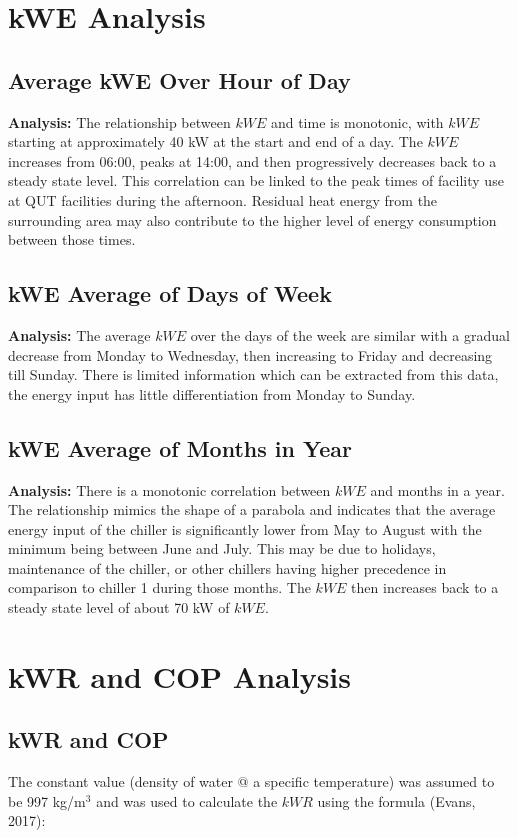 \documentclass{article}
\begin{document}
\section{kWE Analysis}

\subsection{Average kWE Over Hour of Day}
\textbf{Analysis:} The relationship between $kWE$ and time is monotonic, with $kWE$ starting at approximately 40 kW at the start and end of a day. The $kWE$ increases from 06:00, peaks at 14:00, and then progressively decreases back to a steady state level. This correlation can be linked to the peak times of facility use at QUT facilities during the afternoon. Residual heat energy from the surrounding area may also contribute to the higher level of energy consumption between those times.

\subsection{kWE Average of Days of Week}
\textbf{Analysis:} The average $kWE$ over the days of the week are similar with a gradual decrease from Monday to Wednesday, then increasing to Friday and decreasing till Sunday. There is limited information which can be extracted from this data, the energy input has little differentiation from Monday to Sunday.

\subsection{kWE Average of Months in Year}
\textbf{Analysis:} There is a monotonic correlation between $kWE$ and months in a year. The relationship mimics the shape of a parabola and indicates that the average energy input of the chiller is significantly lower from May to August with the minimum being between June and July. This may be due to holidays, maintenance of the chiller, or other chillers having higher precedence in comparison to chiller 1 during those months. The $kWE$ then increases back to a steady state level of about 70 kW of $kWE$.

\section{kWR and COP Analysis}

\subsection{kWR and COP}
The constant value (density of water @ a specific temperature) was assumed to be 997 kg/m$^3$ and was used to calculate the $kWR$ using the formula (Evans, 2017):
\end{document}

